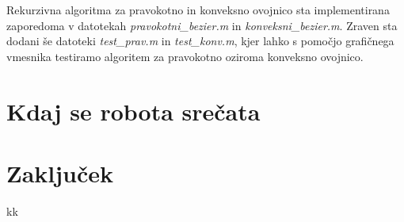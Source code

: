 \documentclass[a4paper, 12pt]{article} %
\begin{document}
Rekurzivna algoritma za pravokotno in konveksno ovojnico sta implementirana zaporedoma v datotekah \emph{pravokotni\_bezier.m} in \emph{konveksni\_bezier.m}.
Zraven sta dodani še datoteki \emph{test\_prav.m} in \emph{test\_konv.m}, kjer lahko s pomočjo grafičnega vmesnika testiramo algoritem za pravokotno oziroma konveksno ovojnico.

\section{Kdaj se robota srečata}

\section{Zaključek}

\begin{thebibliography}{9}
 kk
\end{thebibliography}
\end{document}
